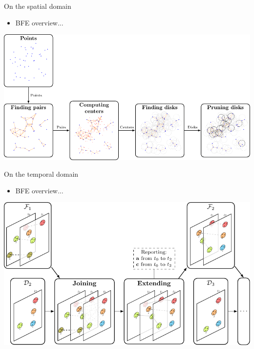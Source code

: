 \begin{frame}{On the spatial domain}
    \begin{itemize} \item BFE overview... \end{itemize} \vspace{0.5cm}

    \centering
    \includegraphics[width=\textwidth]{../thesis/chapterPFlocks/figures/MF_stages2/flow}
\end{frame}

%

\begin{frame}{On the temporal domain}
    \begin{itemize} \item BFE overview... \end{itemize} \vspace{0.5cm}

    \centering
    \includegraphics[width=\textwidth]{../thesis/chapterPFlocks/figures/Temporal/f_stages}
\end{frame}


